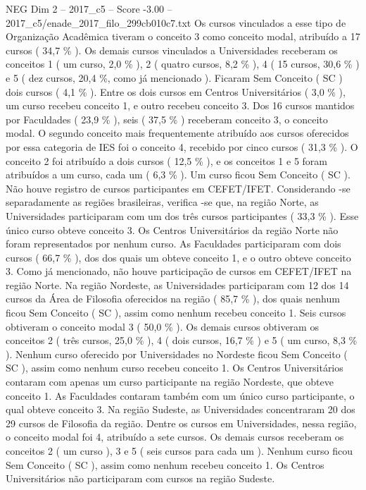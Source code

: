\begin{textsample}{NEG Dim 2 – 2017\_c5 – Score -3.00 – 2017\_c5/enade\_2017\_filo\_299cb010c7.txt}
Os cursos vinculados a esse tipo de Organização Acadêmica tiveram o conceito 3 como conceito modal, atribuído a 17 cursos ( 34,7 \% ).
Os demais cursos vinculados a Universidades receberam os conceitos 1 ( um curso, 2,0 \% ), 2 ( quatro cursos, 8,2 \% ), 4 ( 15 cursos, 30,6 \% ) e 5 ( dez cursos, 20,4 \%, como já mencionado ).
Ficaram Sem Conceito ( SC ) dois cursos ( 4,1 \% ).
Entre os dois cursos em Centros Universitários ( 3,0 \% ), um curso recebeu conceito 1, e outro recebeu conceito 3.
Dos 16 cursos mantidos por Faculdades ( 23,9 \% ), seis ( 37,5 \% ) receberam conceito 3, o conceito modal.
O segundo conceito mais frequentemente atribuído aos cursos oferecidos por essa categoria de IES foi o conceito 4, recebido por cinco cursos ( 31,3 \% ).
O conceito 2 foi atribuído a dois cursos ( 12,5 \% ), e os conceitos 1 e 5 foram atribuídos a um curso, cada um ( 6,3 \% ).
Um curso ficou Sem Conceito ( SC ).
Não houve registro de cursos participantes em CEFET/IFET.
Considerando -se separadamente as regiões brasileiras, verifica -se que, na região Norte, as Universidades participaram com um dos três cursos participantes ( 33,3 \% ).
Esse único curso obteve conceito 3.
Os Centros Universitários da região Norte não foram representados por nenhum curso.
As Faculdades participaram com dois cursos ( 66,7 \% ), dos dos quais um obteve conceito 1, e o outro obteve conceito 3.
Como já mencionado, não houve participação de cursos em CEFET/IFET na região Norte.
Na região Nordeste, as Universidades participaram com 12 dos 14 cursos da Área de Filosofia oferecidos na região ( 85,7 \% ), dos quais nenhum ficou Sem Conceito ( SC ), assim como nenhum recebeu conceito 1.
Seis cursos obtiveram o conceito modal 3 ( 50,0 \% ).
Os demais cursos obtiveram os conceitos 2 ( três cursos, 25,0 \% ), 4 ( dois cursos, 16,7 \% ) e 5 ( um curso, 8,3 \% ).
Nenhum curso oferecido por Universidades no Nordeste ficou Sem Conceito ( SC ), assim como nenhum curso recebeu conceito 1.
Os Centros Universitários contaram com apenas um curso participante na região Nordeste, que obteve conceito 1.
As Faculdades contaram também com um único curso participante, o qual obteve conceito 3.
Na região Sudeste, as Universidades concentraram 20 dos 29 cursos de Filosofia da região.
Dentre os cursos em Universidades, nessa região, o conceito modal foi 4, atribuído a sete cursos.
Os demais cursos receberam os conceitos 2 ( um curso ), 3 e 5 ( seis cursos para cada um ).
Nenhum curso ficou Sem Conceito ( SC ), assim como nenhum recebeu conceito 1.
Os Centros Universitários não participaram com cursos na região Sudeste.

\end{textsample}

